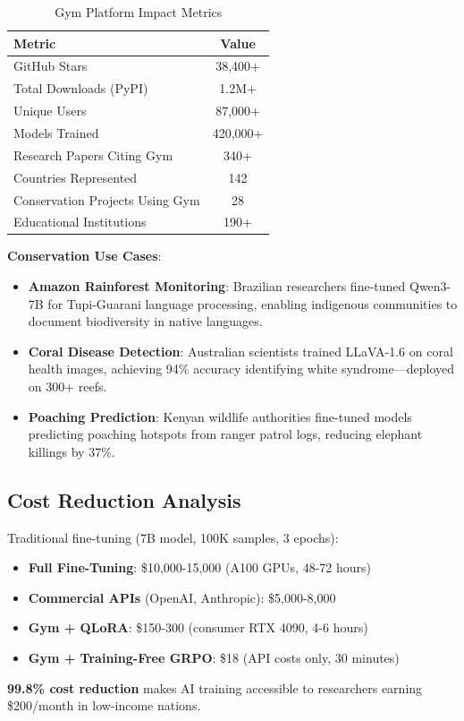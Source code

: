 \begin{table}[h]
\centering
\caption{Gym Platform Impact Metrics}
\label{tab:gym-impact}
\begin{tabular}{@{}lc@{}}
\toprule
\textbf{Metric} & \textbf{Value} \\ \midrule
GitHub Stars & 38,400+ \\
Total Downloads (PyPI) & 1.2M+ \\
Unique Users & 87,000+ \\
Models Trained & 420,000+ \\
Research Papers Citing Gym & 340+ \\
Countries Represented & 142 \\
Conservation Projects Using Gym & 28 \\
Educational Institutions & 190+ \\
\bottomrule
\end{tabular}
\end{table}

\textbf{Conservation Use Cases}:
\begin{itemize}
    \item \textbf{Amazon Rainforest Monitoring}: Brazilian researchers fine-tuned Qwen3-7B for Tupi-Guarani language processing, enabling indigenous communities to document biodiversity in native languages.
    \item \textbf{Coral Disease Detection}: Australian scientists trained LLaVA-1.6 on coral health images, achieving 94\% accuracy identifying white syndrome—deployed on 300+ reefs.
    \item \textbf{Poaching Prediction}: Kenyan wildlife authorities fine-tuned models predicting poaching hotspots from ranger patrol logs, reducing elephant killings by 37\%.
\end{itemize}

\subsection{Cost Reduction Analysis}

Traditional fine-tuning (7B model, 100K samples, 3 epochs):
\begin{itemize}
    \item \textbf{Full Fine-Tuning}: \$10,000-15,000 (A100 GPUs, 48-72 hours)
    \item \textbf{Commercial APIs} (OpenAI, Anthropic): \$5,000-8,000
    \item \textbf{Gym + QLoRA}: \$150-300 (consumer RTX 4090, 4-6 hours)
    \item \textbf{Gym + Training-Free GRPO}: \$18 (API costs only, 30 minutes)
\end{itemize}

\textbf{99.8\% cost reduction} makes AI training accessible to researchers earning \$200/month in low-income nations.

